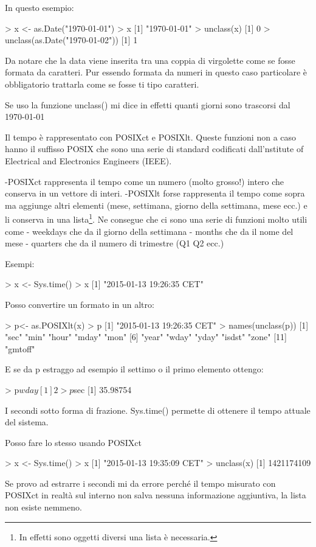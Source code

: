 In questo esempio:

> x <- as.Date("1970-01-01")
> x
[1] "1970-01-01"
> unclass(x)
[1] 0
> unclass(as.Date("1970-01-02"))
[1] 1

Da notare che la data viene inserita tra una coppia di virgolette come se fosse formata da caratteri. Pur essendo formata da numeri in questo caso particolare è obbligatorio trattarla come se fosse ti tipo caratteri.

Se uso la funzione unclass() mi dice in effetti quanti giorni sono trascorsi dal 1970-01-01

Il tempo è rappresentato con POSIXct e POSIXlt.
Queste funzioni non a caso hanno il suffisso POSIX che sono una serie di standard codificati dall'nstitute of Electrical and Electronics Engineers (IEEE).

-POSIXct rappresenta il tempo come un numero (molto grosso!) intero che conserva in un vettore di interi.
-POSIXlt forse rappresenta il tempo come sopra ma aggiunge altri elementi (mese, settimana, giorno della settimana, mese ecc.) e li conserva in una lista\footnote{In effetti sono oggetti diversi una lista è necessaria.}.
Ne consegue che ci sono una serie di funzioni molto utili come
- weekdays che da il giorno della settimana
- months che da il nome del mese
- quarters che da il numero di trimestre (Q1 Q2 ecc.)

Esempi:

> x <- Sys.time()
> x
[1] "2015-01-13 19:26:35 CET"

Posso convertire un formato in un altro:

> p<- as.POSIXlt(x)
> p
[1] "2015-01-13 19:26:35 CET"
> names(unclass(p))
 [1] "sec"    "min"    "hour"   "mday"   "mon"   
 [6] "year"   "wday"   "yday"   "isdst"  "zone"  
[11] "gmtoff"

E se da p estraggo ad esempio il settimo o il primo elemento ottengo:

> p$wday
[1] 2

> p$sec
[1] 35.98754

I secondi sotto forma di frazione.
Sys.time() permette di ottenere il tempo attuale del sistema.

Posso fare lo stesso usando POSIXct

> x <- Sys.time()
> x
[1] "2015-01-13 19:35:09 CET"
> unclass(x)
[1] 1421174109

Se provo ad estrarre i secondi mi da errore perché il tempo misurato con POSIXct in realtà sul interno non salva nessuna informazione aggiuntiva, la lista non esiste nemmeno.

